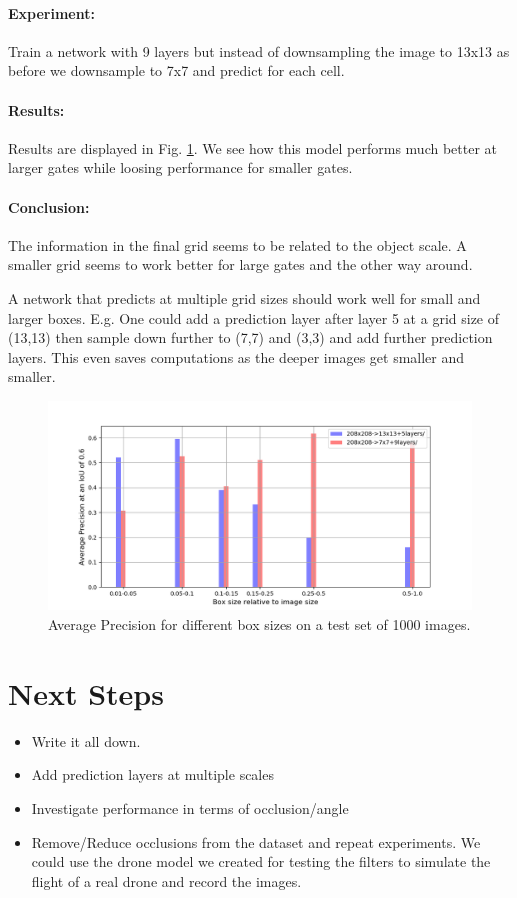 \documentclass{article}
\begin{document}
\paragraph{Experiment:} Train a network with 9 layers but instead of downsampling the image to 13x13 as before we downsample to 7x7 and predict for each cell.
\paragraph{Results:} Results are displayed in Fig. \ref{fig:model}. We see how this model performs much better at larger gates while loosing performance for smaller gates.

\paragraph{Conclusion:} The information in the final grid seems to be related to the object scale. A smaller grid seems to work better for large gates and the other way around.
 
A network that predicts at multiple grid sizes should work well for small and larger boxes. E.g. One could add a prediction layer after layer 5 at a grid size of (13,13) then sample down further to (7,7) and (3,3) and add further prediction layers. This even saves computations as the deeper images get smaller and smaller.


\begin{figure}[htbp]
	\includegraphics[width=\linewidth]{results_model}
	\caption{Average Precision for different box sizes on a test set of 1000 images.}
	\label{fig:model}
\end{figure}

\section{Next Steps}
\begin{itemize}
	\item Write it all down.
	\item Add prediction layers at multiple scales
	\item Investigate performance in terms of occlusion/angle
	\item Remove/Reduce occlusions from the dataset and repeat experiments. We could use the drone model we created for testing the filters to simulate the flight of a real drone and record the images.

\end{itemize}
\end{document}
